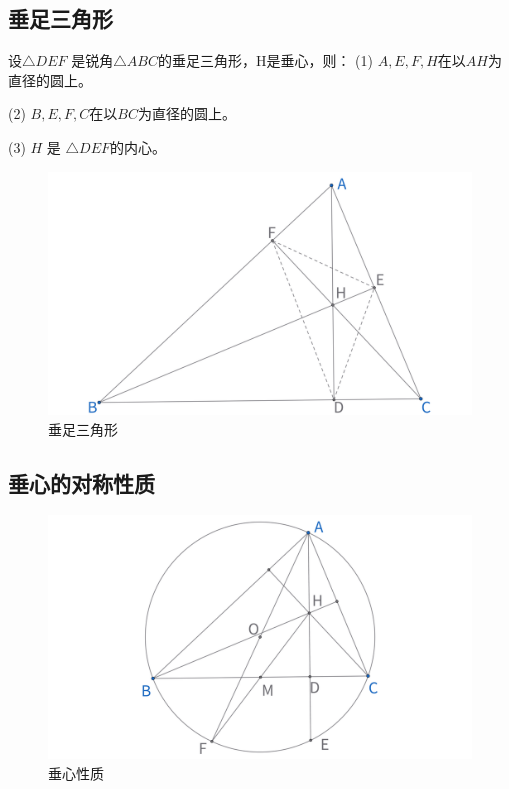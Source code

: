 \newpage
\subsection{垂足三角形}
\begin{proposition}[垂足三角形]
    设$\triangle DEF$ 是锐角$\triangle ABC$的垂足三角形，H是垂心，则：
    (1) $A, E, F, H$在以$AH$为直径的圆上。

    (2) $B, E, F, C$在以$BC$为直径的圆上。

    (3) $H$ 是 $\triangle DEF$的内心。
\end{proposition}
\begin{figure}[H]
    \centering
    \includegraphics[width=0.8\linewidth]{figures/三角形五心/垂足三角形.png}
    \caption{垂足三角形}
\end{figure}



\newpage 
\subsection{垂心的对称性质}
\begin{figure}[H]
    \centering
    \includegraphics[width=0.8\linewidth]{figures/三角形五心/垂心的对称性质.png}
    \caption{垂心性质}
\end{figure}

